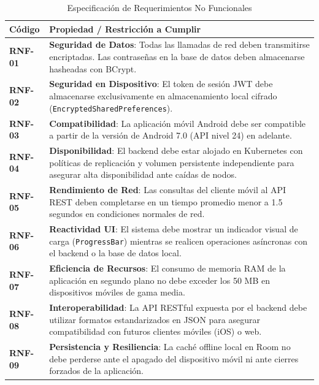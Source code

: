 \documentclass[12pt,a4paper]{report}
\begin{document}
\begin{table}[H]
    \centering
    \caption{Especificación de Requerimientos No Funcionales}
    \vspace{0.2cm}
    \small
    \begin{tabular}{p{2cm} p{10cm}}
        \toprule
        \textbf{Código} & \textbf{Propiedad / Restricción a Cumplir} \\
        \midrule
        \textbf{RNF-01} & \textbf{Seguridad de Datos}: Todas las llamadas de red deben transmitirse encriptadas. Las contraseñas en la base de datos deben almacenarse hasheadas con BCrypt. \\
        \textbf{RNF-02} & \textbf{Seguridad en Dispositivo}: El token de sesión JWT debe almacenarse exclusivamente en almacenamiento local cifrado (\texttt{EncryptedSharedPreferences}). \\
        \textbf{RNF-03} & \textbf{Compatibilidad}: La aplicación móvil Android debe ser compatible a partir de la versión de Android 7.0 (API nivel 24) en adelante. \\
        \textbf{RNF-04} & \textbf{Disponibilidad}: El backend debe estar alojado en Kubernetes con políticas de replicación y volumen persistente independiente para asegurar alta disponibilidad ante caídas de nodos. \\
        \textbf{RNF-05} & \textbf{Rendimiento de Red}: Las consultas del cliente móvil al API REST deben completarse en un tiempo promedio menor a 1.5 segundos en condiciones normales de red. \\
        \textbf{RNF-06} & \textbf{Reactividad UI}: El sistema debe mostrar un indicador visual de carga (\texttt{ProgressBar}) mientras se realicen operaciones asíncronas con el backend o la base de datos local. \\
        \textbf{RNF-07} & \textbf{Eficiencia de Recursos}: El consumo de memoria RAM de la aplicación en segundo plano no debe exceder los 50 MB en dispositivos móviles de gama media. \\
        \textbf{RNF-08} & \textbf{Interoperabilidad}: La API RESTful expuesta por el backend debe utilizar formatos estandarizados en JSON para asegurar compatibilidad con futuros clientes móviles (iOS) o web. \\
        \textbf{RNF-09} & \textbf{Persistencia y Resiliencia}: La caché offline local en Room no debe perderse ante el apagado del dispositivo móvil ni ante cierres forzados de la aplicación. \\
        \bottomrule
    \end{tabular}
\end{table}
\end{document}
